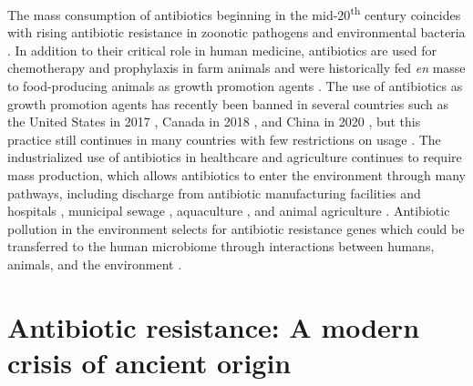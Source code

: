 The mass consumption of antibiotics beginning in the mid-20\textsuperscript{th} century coincides with rising antibiotic resistance in zoonotic pathogens \parencite{Kirchhelle.2018, Ventola.2015} and environmental bacteria \parencite{Madueno.2018}.
In addition to their critical role in human medicine, antibiotics are used for chemotherapy and prophylaxis in farm animals and were historically fed \textit{en} masse to food-producing animals as growth promotion agents \parencite{Kirchhelle.2018, Witte.1998}.
The use of antibiotics as growth promotion agents has recently been banned in several countries such as the United States in 2017 \parencite{Scott.2019}, Canada in 2018 \parencite{Finlay.2019}, and China in 2020 \parencite{Hu.2020}, but this practice still continues in many countries with few restrictions on usage \parencite{Chuanchuen.2014}.
The industrialized use of antibiotics in healthcare and agriculture continues to require mass production, which allows antibiotics to enter the environment through many pathways, including discharge from antibiotic manufacturing facilities and hospitals \parencite{Marathe.2019, Bielen.2017}, municipal sewage \parencite{Parnanen.2019}, aquaculture \parencite{Reverter.2020}, and animal agriculture \parencite{Kirchhelle.2018}.
Antibiotic pollution in the environment selects for antibiotic resistance genes \parencite{Lau.2020, Jechalke.2014, Bielen.2017, Yi.2019} which could be transferred to the human microbiome through interactions between humans, animals, and the environment \parencite{Berendonk.2015, HernandoAmado.2019, Tiedje.2019, Robinson.2016}.

\section{Antibiotic resistance: A modern crisis of ancient origin}

